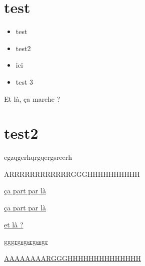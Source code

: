 \documentclass[10pt]{article}
\begin{document}
\section{test}

\lipsum

\begin{itemize}
\item test
\item test2
\item \hypertarget{test}{ici}
\item test 3
\end{itemize}

\label{testC} Et là, \hypertarget{testB}{ça marche ?}

\section{test2}

\label{lalala}

egzqgerhqrgqergsreerh

\hypertarget{arg}{ARRRRRRRRRRRRGGGHHHHHHHHHH}

\newpage

\hyperlink{test}{ça part par là}

\hyperlink{testB}{ça part par là}

\hyperref[testC]{et là ?}

\hyperref[lalala]{gggrgsgsrgssgr}

\hyperlink{arg}{AAAAAAAARGGGHHHHHHHHHHHHHH}
\end{document}

